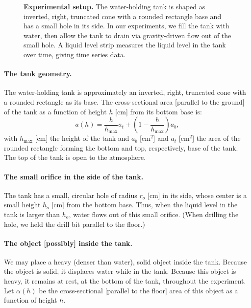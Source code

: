 \documentclass[openacc]{rsproca_new}%
\begin{document}
\begin{figure}[h!]
\begin{center}
	\caption{\textbf{Experimental setup.} 
	The water-holding tank is shaped as inverted, right, truncated cone with a rounded rectangle base and has a small hole in its side. In our experiments, we fill the tank with water, then allow the tank to drain via gravity-driven flow out of the small hole. A liquid level strip measures the liquid level in the tank over time, giving time series data.
	}
	\label{fig:photo_of_tank}
\end{center}
\end{figure}

\paragraph{The tank geometry.} The water-holding tank is approximately an inverted, right, truncated cone with a rounded rectangle as its base. The cross-sectional area [parallel to the ground] of the tank as a function of height $h$ [cm] from its bottom base is:
\begin{equation}
	a(h) = \frac{h}{h_{\text{max}}}a_t + \left(1-\frac{h}{h_{\text{max}}}\right) a_b, \label{eq:a_of_h}
\end{equation}
with $h_{\text{max}}$ [cm] the height of the tank and $a_b$ [cm$^2$] and $a_t$ [cm$^2$] the area of the rounded rectangle forming the bottom and top, respectively, base of the tank.
The top of the tank is open to the atmosphere. 

\paragraph{The small orifice in the side of the tank.} The tank has a small, circular hole of radius $r_o$ [cm] in its side, whose center is a small height $h_o$ [cm] from the bottom base.
Thus, when the liquid level in the tank is larger than $h_o$, water flows out of this small orifice.
(When drilling the hole, we held the drill bit parallel to the floor.) 

\paragraph{The object [possibly] inside the tank.} We may place a heavy (denser than water), solid object inside the tank. Because the object is solid, it displaces water while in the tank. Because this object is heavy, it remains at rest, at the bottom of the tank, throughout the experiment. Let $\alpha(h)$ be the cross-sectional [parallel to the floor] area of this object as a function of height $h$.
\end{document}
